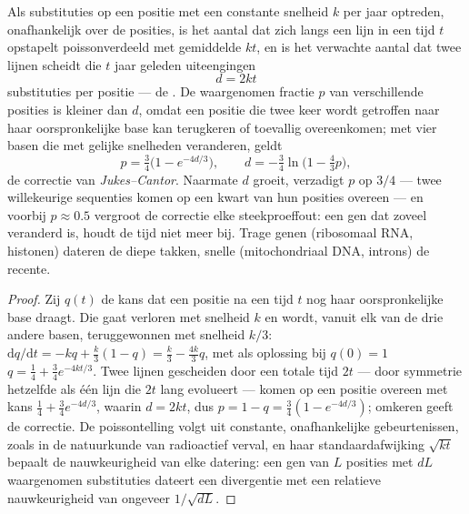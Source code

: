 \begin{theorem}\label{thm:b2:phylogenetic-trees:clock}
Als substituties op een positie met een constante snelheid $k$ per jaar
optreden, onafhankelijk over de posities, is het aantal dat zich langs een
lijn in een tijd $t$ opstapelt poissonverdeeld met gemiddelde $kt$, en is het
verwachte aantal dat twee lijnen scheidt die $t$ jaar geleden uiteengingen
\[
d = 2kt
\]
substituties per positie --- de \emph{}. De waargenomen
fractie $p$ van verschillende posities is kleiner dan $d$, omdat een
positie die twee keer wordt getroffen naar haar oorspronkelijke base kan
terugkeren of toevallig overeenkomen; met vier basen die met gelijke snelheden
veranderen, geldt
\[
p = \tfrac{3}{4}\bigl(1 - e^{-4d/3}\bigr), \qquad
d = -\tfrac{3}{4}\ln\bigl(1 - \tfrac{4}{3}p\bigr),
\]
de correctie van \emph{Jukes--Cantor}. Naarmate $d$ groeit, verzadigt $p$ op
$3/4$ --- twee willekeurige sequenties komen op een kwart van hun posities
overeen --- en voorbij $p \approx 0.5$ vergroot de correctie elke
steekproeffout: een gen dat zoveel veranderd is, houdt de tijd niet meer bij.
Trage genen (ribosomaal RNA, histonen) dateren de diepe takken, snelle
(mitochondriaal DNA, introns) de recente.
\end{theorem}
\begin{proof}
Zij $q(t)$ de kans dat een positie na een tijd $t$ nog haar oorspronkelijke
base draagt. Die gaat verloren met snelheid $k$ en wordt, vanuit elk van de
drie andere basen, teruggewonnen met snelheid $k/3$:
$\mathrm{d}q/\mathrm{d}t = -kq + \tfrac{k}{3}(1 - q) = \tfrac{k}{3} -
\tfrac{4k}{3}q$, met als oplossing bij $q(0) = 1$ $q = \tfrac14 +
\tfrac34 e^{-4kt/3}$. Twee lijnen gescheiden door een totale tijd $2t$ ---
door symmetrie hetzelfde als één lijn die $2t$ lang evolueert --- komen op
een positie overeen met kans $\tfrac14 + \tfrac34 e^{-4d/3}$, waarin $d =
2kt$, dus $p = 1 - q = \tfrac34(1 - e^{-4d/3})$; omkeren geeft de
correctie. De poissontelling volgt uit constante, onafhankelijke
gebeurtenissen, zoals in de natuurkunde van radioactief verval, en haar
standaardafwijking $\sqrt{kt}$ bepaalt de nauwkeurigheid van elke datering: een
gen van $L$ posities met $dL$ waargenomen substituties dateert een
divergentie met een relatieve nauwkeurigheid van ongeveer $1/\sqrt{dL}$.
\end{proof}

